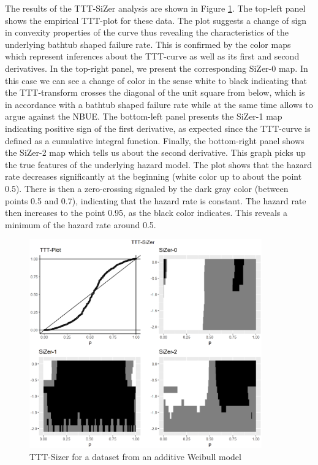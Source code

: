 \documentclass[preprint,12pt]{elsarticle}
\begin{document}
The results of the TTT-SiZer analysis are shown in Figure \ref{Fig:simulatedSizer}. The top-left panel shows the empirical TTT-plot for these data. The plot suggests a change of sign in convexity properties of the curve thus revealing the characteristics of the underlying  bathtub shaped failure rate. This is confirmed by the color maps which represent inferences about the TTT-curve as well as its first and second derivatives. In the top-right panel, we present the corresponding SiZer-0 map. In this case we can see a change of color in the sense white to black indicating that the TTT-transform crosses the diagonal of the unit square from below, which is in accordance with a bathtub shaped failure rate while at the same time allows to argue against the NBUE. The bottom-left panel presents the SiZer-1 map indicating positive sign of the first derivative, as expected since the TTT-curve is defined as a cumulative integral function. Finally, the bottom-right panel shows the SiZer-2 map which tells us about the second derivative. This graph picks up the true features of the underlying hazard model. 
The plot shows that the hazard rate decreases significantly at the beginning (white color up to about the point 0.5). There is then a zero-crossing  signaled by the dark gray color  (between points 0.5 and 0.7), indicating that the hazard rate is constant. The hazard rate then increases to the point 0.95, as the black color indicates. This reveals a minimum of the hazard rate around 0.5.
  

\begin{figure}[htb]
\begin{center}
\includegraphics[height=9cm]{motivatingSiZerCubic_log10.EPS}
\caption{TTT-Sizer for a dataset from an additive Weibull model}\label{Fig:simulatedSizer}
\end{center}
\end{figure}
\end{document}
